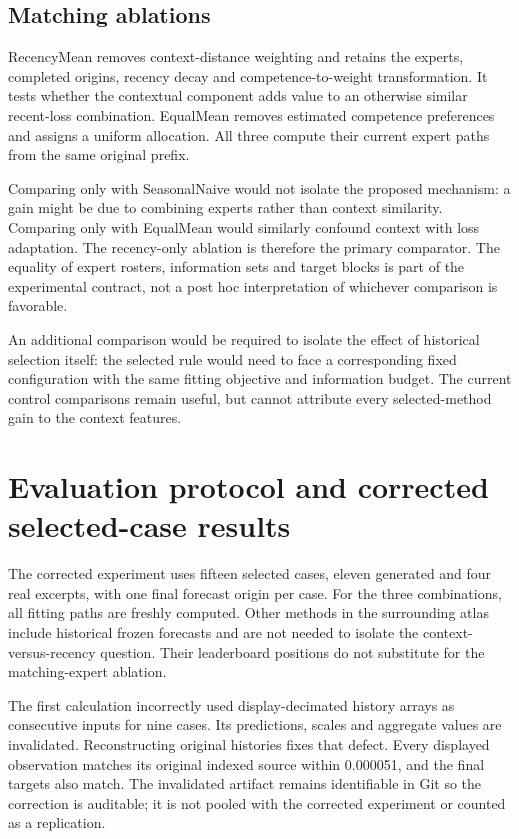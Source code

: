 \documentclass[11pt,a4paper]{article}
\begin{document}
\subsection{Matching ablations}
RecencyMean removes context-distance weighting and retains the experts, completed origins, recency decay and competence-to-weight transformation. It tests whether the contextual component adds value to an otherwise similar recent-loss combination. EqualMean removes estimated competence preferences and assigns a uniform allocation. All three compute their current expert paths from the same original prefix.

Comparing only with SeasonalNaive would not isolate the proposed mechanism: a gain might be due to combining experts rather than context similarity. Comparing only with EqualMean would similarly confound context with loss adaptation. The recency-only ablation is therefore the primary comparator. The equality of expert rosters, information sets and target blocks is part of the experimental contract, not a post hoc interpretation of whichever comparison is favorable.

An additional comparison would be required to isolate the effect of historical selection itself: the selected rule would need to face a corresponding fixed configuration with the same fitting objective and information budget. The current control comparisons remain useful, but cannot attribute every selected-method gain to the context features.

\section{Evaluation protocol and corrected selected-case results}
The corrected experiment uses fifteen selected cases, eleven generated and four real excerpts, with one final forecast origin per case. For the three combinations, all fitting paths are freshly computed. Other methods in the surrounding atlas include historical frozen forecasts and are not needed to isolate the context-versus-recency question. Their leaderboard positions do not substitute for the matching-expert ablation.

The first calculation incorrectly used display-decimated history arrays as consecutive inputs for nine cases. Its predictions, scales and aggregate values are invalidated. Reconstructing original histories fixes that defect. Every displayed observation matches its original indexed source within 0.000051, and the final targets also match. The invalidated artifact remains identifiable in Git so the correction is auditable; it is not pooled with the corrected experiment or counted as a replication.
\end{document}

